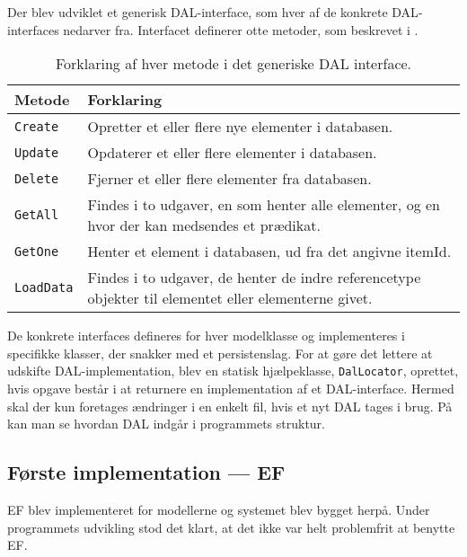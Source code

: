 Der blev udviklet et generisk \ac{DAL}-interface, som hver af de konkrete \ac{DAL}-interfaces nedarver fra.
Interfacet definerer otte metoder, som beskrevet i .

\begin{table}[h]
    \begin{tabular}{p{2cm}|p{13cm}}
    \textbf{Metode}   & \textbf{Forklaring}       \\ \hline
    \texttt{Create}   & Opretter et eller flere nye elementer i databasen.                                           \\ \hline
    \texttt{Update}   & Opdaterer et eller flere elementer i databasen.                                              \\ \hline
    \texttt{Delete}   & Fjerner et eller flere elementer fra databasen.                                              \\ \hline
    \texttt{GetAll}   & Findes i to udgaver, en som henter alle elementer, og en hvor der kan medsendes et prædikat. \\ \hline
    \texttt{GetOne}   & Henter et element i databasen, ud fra det angivne itemId.                                    \\ \hline
    \texttt{LoadData} & Findes i to udgaver, de henter de indre referencetype objekter til elementet eller elementerne givet. \\ \hline
    \end{tabular}
    \caption{Forklaring af hver metode i det generiske DAL interface.}
    \label{tab:ourExtCrud}
\end{table}

De konkrete interfaces defineres for hver modelklasse og implementeres i specifikke klasser, der snakker med et persistenslag.
For at gøre det lettere at udskifte \ac{DAL}-implementation, blev en statisk hjælpeklasse, \texttt{DalLocator}, oprettet, hvis opgave består i at returnere en implementation af et \ac{DAL}-interface. Hermed skal der kun foretages ændringer i en enkelt fil, hvis et nyt DAL tages i brug.
På  kan man se hvordan \ac{DAL} indgår i programmets struktur.

\subsection{Første implementation --- \acl{EF}}

\acl{EF} blev implementeret for modellerne og systemet blev bygget herpå.
Under programmets udvikling stod det klart, at det ikke var helt problemfrit at benytte \ac{EF}.


